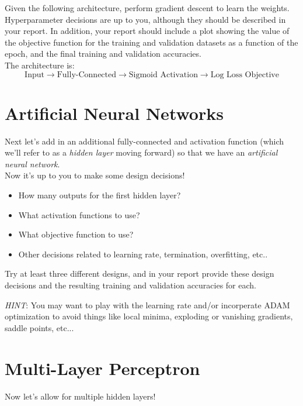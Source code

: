 \documentclass[12pt]{article}
\begin{document}
\noindent
Given the following architecture, perform gradient descent to learn the weights.  Hyperparameter decisions are up to you, although they should be described in your report.  In addition, your report should include a plot showing the value of the objective function for the training and validation datasets as a function of the epoch, and the final training and validation accuracies.\\

\noindent
The architecture is:
$$\text{Input} \rightarrow \text{Fully-Connected} \rightarrow \text{Sigmoid Activation} \rightarrow \text{Log Loss Objective}$$

\section{Artificial Neural Networks}
Next let's add in an additional fully-connected and activation function (which we'll refer to as a \emph{hidden layer} moving forward) so that we have an \emph{artificial neural network}.\\

\noindent
Now it's up to you to make some design decisions!  
\begin{itemize}
\item How many outputs for the first hidden layer?
\item What activation functions to use?
\item What objective function to use?
\item Other decisions related to learning rate, termination, overfitting, etc..
\end{itemize}

\noindent
Try at least three different designs, and in your report provide these design decisions and the resulting training and validation accuracies for each.\\

\begin{centering}
\emph{HINT}: You may want to play with the learning rate and/or incorperate ADAM optimization to avoid things like local minima, exploding or vanishing gradients, saddle points, etc...
\end{centering}

\newpage
\section{Multi-Layer Perceptron}
Now let's allow for multiple hidden layers!\\
\end{document}
